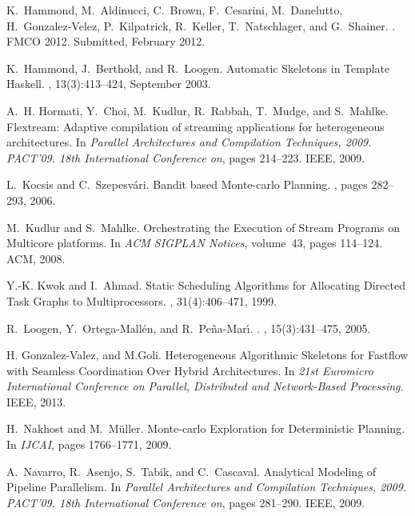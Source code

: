 \documentclass[smallextended]{svjour3}
\begin{document}
\begin{thebibliography}{10}
K.~Hammond, M.~Aldinucci, C.~Brown, F.~Cesarini, M.~Danelutto,
  H.~Gonzalez-Velez, P.~Kilpatrick, R.~Keller, T.~Natschlager, and G.~Shainer.
.
\newblock FMCO 2012. Submitted, February 2012.

K.~Hammond, J.~Berthold, and R.~Loogen.
\newblock Automatic {S}keletons in {T}emplate {H}askell.
, 13(3):413--424, September 2003.

A.~H. Hormati, Y.~Choi, M.~Kudlur, R.~Rabbah, T.~Mudge, and S.~Mahlke.
\newblock Flextream: Adaptive compilation of streaming applications for
  heterogeneous architectures.
\newblock In {\em Parallel Architectures and Compilation Techniques, 2009.
  PACT'09. 18th International Conference on}, pages 214--223. IEEE, 2009.

L.~Kocsis and C.~Szepesv{\'a}ri.
\newblock Bandit based Monte-carlo Planning.
, pages 282--293, 2006.

M.~Kudlur and S.~Mahlke.
\newblock Orchestrating the Execution of Stream Programs on Multicore
  platforms.
\newblock In {\em ACM SIGPLAN Notices}, volume~43, pages 114--124. ACM, 2008.

Y.-K. Kwok and I.~Ahmad.
\newblock Static Scheduling Algorithms for Allocating Directed Task Graphs to
  Multiprocessors.
, 31(4):406--471, 1999.

R.~Loogen, Y.~Ortega-Mall\'{e}n, and R.~{Pe\~{n}a-Mar\'{\i}}.
.
, 15(3):431--475, 2005.

H. Gonzalez-Valez, and M.Goli.
\newblock Heterogeneous Algorithmic Skeletons for Fastflow with Seamless
  Coordination Over Hybrid Architectures.
\newblock In {\em 21st Euromicro International Conference on Parallel,
  Distributed and Network-Based Processing.} IEEE, 2013.

H.~Nakhost and M.~M{\"u}ller.
\newblock Monte-carlo Exploration for Deterministic Planning.
\newblock In {\em IJCAI}, pages 1766--1771, 2009.

A.~Navarro, R.~Asenjo, S.~Tabik, and C.~Cascaval.
\newblock Analytical Modeling of Pipeline Parallelism.
\newblock In {\em Parallel Architectures and Compilation Techniques, 2009.
  PACT'09. 18th International Conference on}, pages 281--290. IEEE, 2009.


\end{thebibliography}
\end{document}

